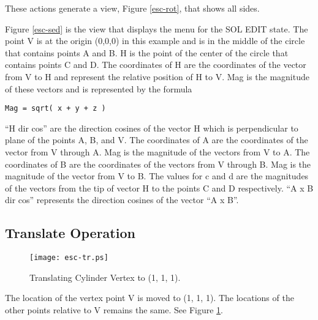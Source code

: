 These actions generate a view, Figure \ref{esc-rot}, that shows all sides.


Figure \ref{esc-sed} is the view that displays the menu
for the SOL EDIT state.
The
point V is at the origin (0,0,0) in this example and is in the middle of the
circle that contains points A and B.  H is the point of the center of the
circle that contains points C and D.  The coordinates of H are the coordinates
of the vector from V to H and represent the relative position of H to V.  Mag
is the magnitude of these vectors and is represented by the formula
\begin{center}
\begin{verbatim}
Mag = sqrt( x + y + z )
\end{verbatim}
\end{center}

``H dir cos'' are the direction cosines of the vector H which
is perpendicular to plane of the points A, B, and V.  The coordinates of A
are the coordinates of the vector from V through A.  Mag is the magnitude of
the vectors from V to A.  The coordinates of B are the coordinates of the
vectors from V through B.  Mag is the magnitude of the vector from V to B.
The values for c and d are the magnitudes of the vectors from the tip of
vector H to the points C
and D respectively.
``A x B dir cos'' represents the direction cosines of the
vector ``A x B''.

\subsection{Translate Operation}

\begin{figure}
\centering \texttt{[image: esc-tr.ps]}
\caption{Translating Cylinder Vertex to (1, 1, 1).}
\label{esc-tr}
\end{figure}


The location of the vertex point V is moved to (1, 1, 1).
The locations of the other
points relative to V remains the same.  See Figure \ref{esc-tr}.

